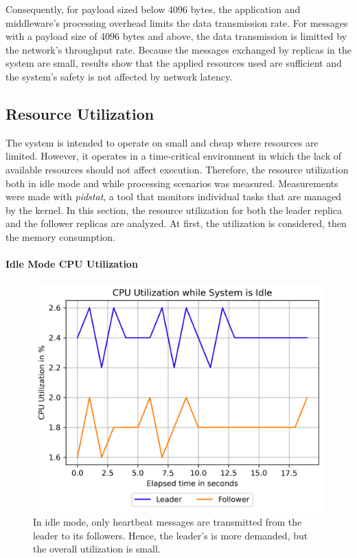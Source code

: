 Consequently, for payload sized below 4096 bytes, the application and middleware's processing overhead limits the data transmission rate.
For messages with a payload size of 4096 bytes and above, the data transmission is limitted by the network's throughput rate.
Because the messages exchanged by replicas in the system are small, results show that the applied resources used are sufficient and the system's safety is not affected by network latency.


\subsection{Resource Utilization}

The system is intended to operate on small and cheap  where resources are limited.
However, it operates in a time-critical environment in which the lack of available resources should not affect execution.
Therefore, the resource utilization both in idle mode and while processing scenarios was measured.
Measurements were made with \textit{pidstat}, a tool that monitors individual tasks that are managed by the  kernel.
In this section, the resource utilization for both the leader replica and the follower replicas are analyzed.
At first, the  utilization is considered, then the memory consumption.

\paragraph{Idle Mode CPU Utilization}

\begin{figure}[!hbt]
	\centering
	\includegraphics[width=0.8\linewidth]{images/plots/CPUUsageIdleTime}
	\caption{In idle mode, only heartbeat messages are transmitted from the leader to its followers. Hence, the leader's  is more demanded, but the overall utilization is small.}
	\label{fig:PlotCPUUsageIdleTime}
\end{figure}


